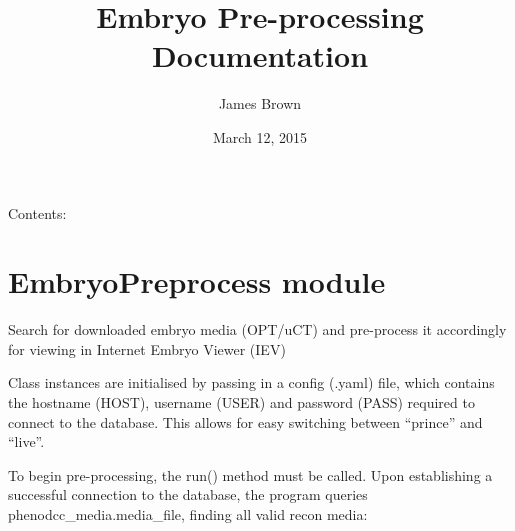 \documentclass[letterpaper,10pt,english]{sphinxmanual}
\title{Embryo Pre-processing Documentation}
\date{March 12, 2015}
\author{James Brown}
\begin{document}
\maketitle
\tableofcontents
{}\label{index::doc}


Contents:


\chapter{EmbryoPreprocess module}
\label{EmbryoPreprocess::doc}\label{EmbryoPreprocess:module-EmbryoPreprocess}\label{EmbryoPreprocess:welcome-to-embryo-pre-processing-s-documentation}\label{EmbryoPreprocess:embryopreprocess-module}
Search for downloaded embryo media (OPT/uCT) and pre-process it accordingly for viewing in Internet Embryo Viewer (IEV)

Class instances are initialised by passing in a config (.yaml) file, which contains the hostname (HOST),
username (USER) and password (PASS) required to connect to the database. This allows for easy switching between
``prince'' and ``live''.

To begin pre-processing, the run() method must be called. Upon establishing a successful connection to the database,
the program queries phenodcc\_media.media\_file, finding all valid recon media:
\end{document}
